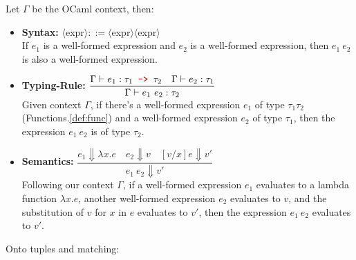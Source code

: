 \begin{Def} 

    Let $\Gamma$ be the OCaml context, then:
    \begin{itemize}
        \item \textbf{Syntax:} \LARGE $\langle$expr$\rangle::=$\texttr{ }$\langle$expr$\rangle$\texttr{ }$\langle$expr$\rangle$\normalsize\\
        
        \vspace{-.5em}
        \noindent
        If $e_1$ is a well-formed expression and $e_2$ is a well-formed expression, then $e_1\ e_2$ is also a well-formed expression.

        \item \textbf{Typing-Rule:} \LARGE $\dfrac{\Gamma\vdash e_1:\tau_1\texttr{ -> }\tau_2 \quad \Gamma\vdash e_2:\tau_1}{\Gamma\vdash e_1\ e_2:\tau_2}$ \normalsize\\
        
        \noindent
        Given context $\Gamma$, if there's a well-formed expression $e_1$ of type $\tau_1$\texttr{ -> }$\tau_2$ (Functions.\ref{def:func}) and a well-formed expression $e_2$ of type $\tau_1$, then the expression $e_1\ e_2$ is of type $\tau_2$.

        \item \textbf{Semantics:} \LARGE $\dfrac{e_1\Downarrow\lambda x.e \quad e_2\Downarrow v \quad [v/x]e\Downarrow v'}{e_1\ e_2\Downarrow v'}$ \normalsize\\
        
        \noindent
        Following our context $\Gamma$, if a well-formed expression $e_1$ evaluates to a lambda function $\lambda x.e$, another well-formed expression $e_2$ evaluates to $v$, and the substitution of $v$ for $x$ in $e$ evaluates to $v'$, then the expression $e_1\ e_2$ evaluates to $v'$.
    \end{itemize}
\end{Def}

\newpage 

\noindent
Onto tuples and matching:

